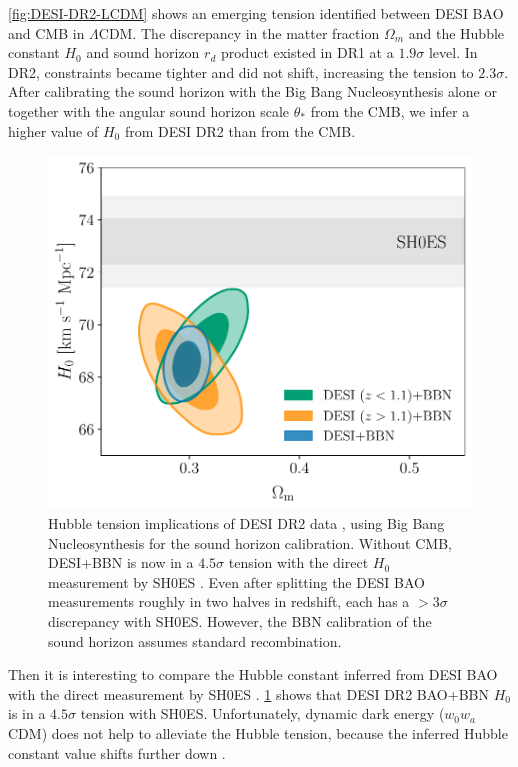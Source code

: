 \cref{fig:DESI-DR2-LCDM} shows an emerging tension identified between DESI BAO and CMB in $\Lambda$CDM.
The discrepancy in the matter fraction $\Omega_m$ and the Hubble constant $H_0$ and sound horizon $r_d$ product existed in DR1 at a $1.9\sigma$ level.
In DR2, constraints became tighter and did not shift, increasing the tension to $2.3\sigma$.
After calibrating the sound horizon with the Big Bang Nucleosynthesis \citep[BBN,][]{BBN-2024} alone or together with the angular sound horizon scale $\theta_*$ from the CMB, we infer a higher value of $H_0$ from DESI DR2 than from the CMB.

\begin{figure}[htbp]
    \centering
    \includegraphics[width=\textwidth]{DR2/DESI_BAO_BBN_tension_SH0ES_v2.pdf}
    \caption[Hubble tension implications of DESI DR2 data]{Hubble tension implications of DESI DR2 data \citep[figures reproduced from][]{DESI.DR2.BAO.cosmo}, using Big Bang Nucleosynthesis \citep[BBN,][]{BBN-2024} for the sound horizon calibration.
    Without CMB, DESI+BBN is now in a $4.5\sigma$ tension with the direct $H_0$ measurement by SH0ES \citep{SH0ES-2022}.
    Even after splitting the DESI BAO measurements roughly in two halves in redshift, each has a $>3\sigma$ discrepancy with SH0ES.
    However, the BBN calibration of the sound horizon assumes standard recombination.}
    \label{fig:DESI-DR2-H0-tension}
\end{figure}

Then it is interesting to compare the Hubble constant inferred from DESI BAO with the direct measurement by SH0ES \citep[which is also famously higher than inferred from the CMB,][]{SH0ES-2022}.
\cref{fig:DESI-DR2-H0-tension} shows that DESI DR2 BAO+BBN $H_0$ is in a $4.5\sigma$ tension with SH0ES.
Unfortunately, dynamic dark energy ($w_0w_a$CDM) does not help to alleviate the Hubble tension, because the inferred Hubble constant value shifts further down \citep{DESI.DR2.BAO.cosmo}.

